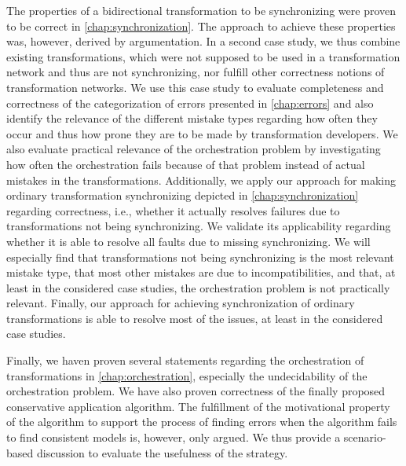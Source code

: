 The properties of a bidirectional transformation to be synchronizing were proven to be correct in \autoref{chap:synchronization}.
The approach to achieve these properties was, however, derived by argumentation.
In a second case study, we thus combine existing transformations, which were not supposed to be used in a transformation network and thus are not synchronizing, nor fulfill other correctness notions of transformation networks.
We use this case study to evaluate completeness and correctness of the categorization of errors presented in \autoref{chap:errors} and also identify the relevance of the different mistake types regarding how often they occur and thus how prone they are to be made by transformation developers.
We also evaluate practical relevance of the orchestration problem by investigating how often the orchestration fails because of that problem instead of actual mistakes in the transformations.
Additionally, we apply our approach for making ordinary transformation synchronizing depicted in \autoref{chap:synchronization} regarding correctness, i.e., whether it actually resolves failures due to transformations not being synchronizing. %
We validate its applicability regarding whether it is able to resolve all faults due to missing synchronizing.
We will especially find that transformations not being synchronizing is the most relevant mistake type, that most other mistakes are due to incompatibilities, and that, at least in the considered case studies, the orchestration problem is not practically relevant.
Finally, our approach for achieving synchronization of ordinary transformations is able to resolve most of the issues, at least in the considered case studies.

Finally, we haven proven several statements regarding the orchestration of transformations in \autoref{chap:orchestration}, especially the undecidability of the orchestration problem.
We have also proven correctness of the finally proposed conservative application algorithm.
The fulfillment of the motivational property of the algorithm to support the process of finding errors when the algorithm fails to find consistent models is, however, only argued.
We thus provide a scenario-based discussion to evaluate the usefulness of the strategy.

